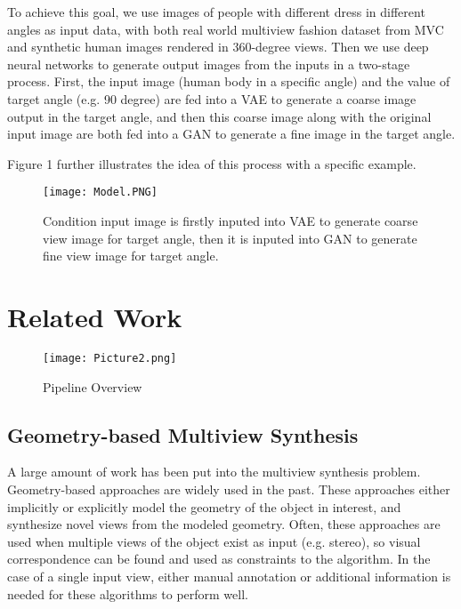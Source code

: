 \documentclass[10pt,conference]{IEEEtran}
\begin{document}
To achieve this goal, we use images of people with different dress in different angles as input data, with both real world multiview fashion dataset from MVC \autocite{liu2016mvc} and synthetic human images rendered in 360-degree views. Then we use deep neural networks to generate output images from the inputs in a two-stage process. First, the input image (human body in a specific angle) and the value of target angle (e.g. 90 degree) are fed into a VAE to generate a coarse image output in the target angle, and then this coarse image along with the original input image are both fed into a GAN to generate a fine image in the target angle.

Figure 1 further illustrates the idea of this process with a specific example.

\begin{figure}[htbp]
\centering
\texttt{[image: Model.PNG]}
\caption{Condition input image is firstly inputed into VAE to generate coarse view image for target angle, then it is inputed into GAN to generate fine view image for target angle.}
\end{figure}


\section{Related Work}




\begin{figure*}[htbp]
\centering
\texttt{[image: Picture2.png]}
\caption{Pipeline Overview}
\end{figure*}

\subsection{Geometry-based Multiview Synthesis}

A large amount of work has been put into the multiview synthesis problem. Geometry-based approaches are widely used in the past. These approaches either implicitly or explicitly model the geometry of the object in interest, and synthesize novel views from the modeled geometry. Often, these approaches are used when multiple views \autocite{furukawa2015multi} of the object exist as input (e.g. stereo), so visual correspondence can be found and used as constraints to the algorithm. In the case of a single input view, either manual annotation \autocite{chen20133} or additional information \autocite{su20143d} is needed for these algorithms to perform well.
\end{document}
